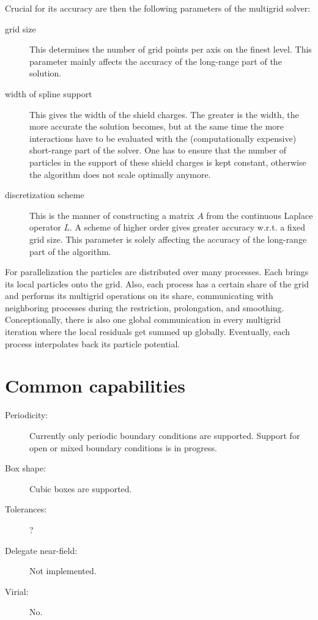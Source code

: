 Crucial for its accuracy are then the following parameters of the multigrid solver:
\begin{description}
 \item[grid size] This determines the number of grid points per axis on the finest level. This parameter mainly affects the accuracy of the long-range part of the solution.
 \item[width of spline support] This gives the width of the shield charges. The greater is the width, the more accurate the solution becomes, but at the same time the more interactions have to be evaluated with the (computationally expensive) short-range part of the solver. One has to ensure that the number of particles in the support of these shield charges is kept constant, otherwise the algorithm does not scale optimally anymore.
 \item[discretization scheme] This is the manner of constructing a matrix $A$ from the continuous Laplace operator $L$. A scheme of higher order gives greater accuracy w.r.t. a fixed grid size. This parameter is solely affecting the accuracy of the long-range part of the algorithm.
\end{description}

For parallelization the particles are distributed over many processes. Each brings its local particles onto the grid. Also, each process has a certain share of the grid and performs its multigrid operations on its share, communicating with neighboring processes during the restriction, prolongation, and smoothing. Conceptionally, there is also one global communication in every multigrid iteration where the local residuals get summed up globally. Eventually, each process interpolates back its particle potential.

\section*{Common capabilities}

\begin{description}

  \item[Periodicity:]
Currently only periodic boundary conditions are supported. Support for open or mixed boundary conditions is in progress.

  \item[Box shape:] Cubic boxes are supported.
  
  \item[Tolerances:] ?

  \item[Delegate near-field:] Not implemented.

  \item[Virial:] No.

\end{description}

